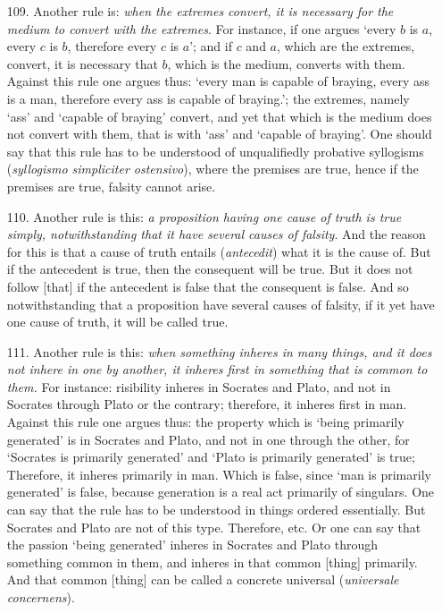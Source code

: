\documentclass[]{article}
\begin{document}
\begin{itemize}
\item[109.] Another rule is: \textit{when the extremes convert, it is necessary for the medium to convert with the extremes}. For instance, if one argues `every $b$ is $a$, every $c$ is $b$, therefore every $c$ is $a$'; and if $c$ and $a$, which are the extremes, convert, it is necessary that $b$, which is the medium, converts with them. Against this rule one argues thus: `every man is capable of braying, every ass is a man, therefore every ass is capable of braying.'; the extremes, namely `ass' and `capable of braying' convert, and yet that which is the medium does not convert with them, that is with `ass' and `capable of braying'. One should say that this rule has to be understood of unqualifiedly probative syllogisms (\textit{syllogismo simpliciter ostensivo}), where the premises are true, hence if the premises are true, falsity cannot arise. 
\item[110.] Another rule is this: \textit{a proposition having one cause of truth is true simply, notwithstanding that it have several causes of falsity}. And the reason for this is that a cause of truth entails (\textit{antecedit}) what it is the cause of. But if the antecedent is true, then the consequent will be true. But it does not follow [that] if the antecedent is false that the consequent is false. And so notwithstanding that a proposition have several causes of falsity, if it yet have one cause of truth, it will be called true.
\item[111.] Another rule is this: \textit{when something inheres in many things, and it does not inhere in one by another, it inheres first in something that is common to them.} For instance: risibility inheres in Socrates and Plato, and not in Socrates through Plato or the contrary; therefore, it inheres first in man. Against this rule one argues thus: the property which is `being primarily generated' is in Socrates and Plato, and not in one through the other, for `Socrates is primarily generated' and `Plato is primarily generated' is true; Therefore, it inheres primarily in man. Which is false, since `man is primarily generated' is false, because generation is a real act primarily of singulars. One can say that the rule has to be understood in things ordered essentially. But Socrates and Plato are not of this type. Therefore, etc. Or one can say that the passion `being generated' inheres in Socrates and Plato through something common in them, and inheres in that common [thing] primarily. And that common [thing] can be called a concrete universal (\textit{universale concernens}).

\end{itemize}
\end{document}
